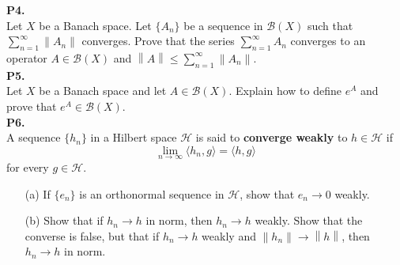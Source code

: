 \documentclass{article}
\newcommand{\norm}[1]{\left\lVert#1\right\rVert}
\begin{document}
    \textbf{P4.}\\

    Let $X$ be a Banach space. Let $\{A_n\}$ be a sequence in $\mathcal{B}(X)$ such that $\sum_{n=1}^{\infty} \norm{A_n}$
    converges. Prove that the series $\sum_{n=1}^{\infty} A_n$ converges to an operator $A\in\mathcal{B}(X)$ and
    $\norm{A}\leq\sum_{n=1}^{\infty} \norm{A_n}$.\\

    \textbf{P5.}\\

    Let $X$ be a Banach space and let $A\in\mathcal{B}(X)$. Explain how to define $e^A$ and prove that $e^A\in\mathcal{B}(X)$.\\

    \textbf{P6.}\\

    A sequence $\{h_n\}$ in a Hilbert space $\mathcal{H}$ is said to \textbf{converge weakly} to $h\in\mathcal{H}$ if
    \[ \lim_{n\to\infty} \langle h_n,g\rangle = \langle h,g\rangle \]
    for every $g\in\mathcal{H}$.
    \begin{enumerate}
        \item[(a)] If $\{e_n\}$ is an orthonormal sequence in $\mathcal{H}$, show that $e_n\to 0$ weakly.
        \item[(b)] Show that if $h_n\to h$ in norm, then $h_n\to h$ weakly. Show that the converse is false, but that if
            $h_n\to h$ weakly and $\norm{h_n}\to\norm{h}$, then $h_n\to h$ in norm.
    \end{enumerate}
\end{document}
